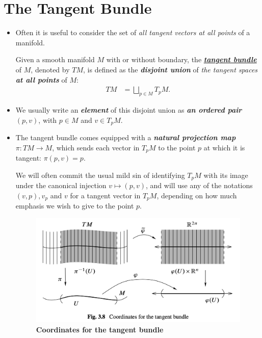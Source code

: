 \documentclass[11pt]{article}
\begin{document}
\section{The Tangent Bundle}
\begin{itemize}
\item Often it is useful to consider the set of \emph{all tangent vectors at all points} of a manifold. 
\begin{definition}
Given a smooth manifold $M$ with or without boundary, the \underline{\emph{\textbf{tangent bundle}}} of $M$, denoted by $TM$, is defined as the \emph{\textbf{disjoint union}} of \emph{the tangent spaces} \emph{\textbf{at all points}} of $M$:
\begin{align*}
TM &= \bigsqcup_{p \in M}T_{p}M.
\end{align*}
\end{definition}

\item We usually write an \emph{\textbf{element}} of this disjoint union as \emph{\textbf{an ordered pair}} $(p, v)$, with $p \in M$ and $v \in T_{p}M$.

\item \begin{definition}
The tangent bundle comes equipped with a \emph{\textbf{natural projection map}} $\pi: TM \rightarrow M$, which sends each vector in $T_{p}M$ to the point $p$ at which it is tangent: $\pi(p, v) = p$.
\end{definition}

We will often commit the usual mild sin of identifying $T_{p}M$ with its image under the canonical injection $v \mapsto (p, v)$, and will use any of the notations $(v, p),  v_{p}$ and $v$ for a tangent vector in $T_{p}M$, depending on how much emphasis we wish to give to the point $p$.

\begin{figure}
\begin{minipage}[t]{1\linewidth}
  \centering
  \centerline{\includegraphics[scale = 0.5]{coordinate_tangent_bundle.png}}
\end{minipage}
\caption{\footnotesize{\textbf{Coordinates for the tangent bundle \citep{lee2003introduction}}}}
\label{fig: coordinate_tangent_bundle}
\end{figure}


\end{itemize}
\end{document}
